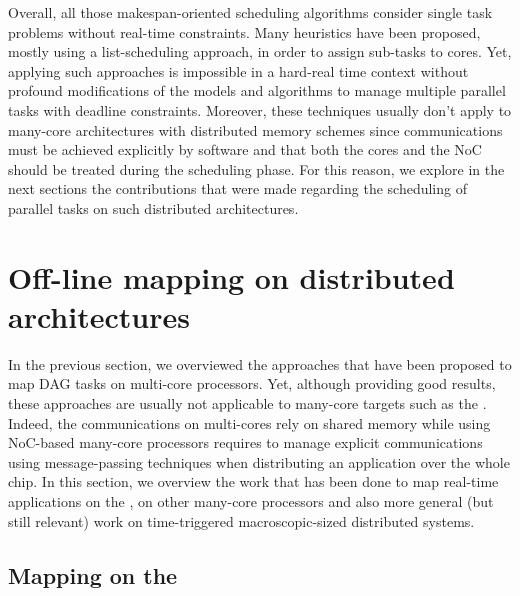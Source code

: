 \documentclass[main.tex]{subfiles}
\begin{document}
Overall, all those makespan-oriented scheduling algorithms consider single task problems without real-time constraints. Many heuristics have been proposed, mostly using a list-scheduling approach, in order to assign sub-tasks to cores. Yet, applying such approaches is impossible in a hard-real time context without profound modifications of the models and algorithms to manage multiple parallel tasks with deadline constraints. Moreover, these techniques usually don't apply to many-core architectures with distributed memory schemes since communications must be achieved explicitly by software and that both the cores and the NoC should be treated during the scheduling phase. For this reason, we explore in the next sections the contributions that were made regarding the scheduling of parallel tasks on such distributed architectures.



\section{Off-line mapping on distributed architectures}

In the previous section, we overviewed the approaches that have been proposed to map DAG tasks on multi-core processors. Yet, although providing good results, these approaches are usually not applicable to many-core targets such as the \mppalong. 
Indeed, the communications on multi-cores rely on shared memory while using NoC-based many-core processors requires to manage explicit communications using message-passing techniques when distributing an application over the whole chip. In this section, we overview the work that has been done to map real-time applications on the \mppalong, on other many-core processors and also more general (but still relevant) work on time-triggered macroscopic-sized distributed systems. 

\subsection{Mapping on the \mppalong}
\end{document}
